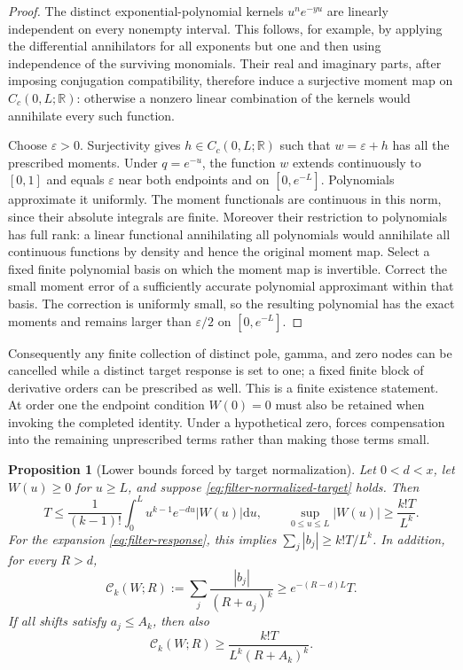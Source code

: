 \documentclass[11pt]{article}
\newtheorem{proposition}[theorem]{Proposition}
\theoremstyle{definition}
\theoremstyle{remark}
\newcommand{\R}{\mathbb R}
\newcommand{\dd}{\mathrm d}
\begin{document}
\begin{proof}
The distinct exponential-polynomial kernels $u^ne^{-yu}$ are linearly
independent on every nonempty interval.  This follows, for example, by
applying the differential annihilators for all exponents but one and
then using independence of the surviving monomials.  Their real and
imaginary parts, after imposing conjugation compatibility, therefore
induce a surjective moment map on $C_c(0,L;\R)$: otherwise a nonzero
linear combination of the kernels would annihilate every such function.

Choose $\varepsilon>0$.  Surjectivity gives $h\in C_c(0,L;\R)$ such
that $w=\varepsilon+h$ has all the prescribed moments.  Under
$q=e^{-u}$, the function $w$ extends continuously to $[0,1]$ and equals
$\varepsilon$ near both endpoints and on $[0,e^{-L}]$.
Polynomials approximate it uniformly.  The moment functionals are
continuous in this norm, since their absolute integrals are finite.
Moreover their restriction to polynomials has full rank: a linear
functional annihilating all polynomials would annihilate all continuous
functions by density and hence the original moment map.  Select a fixed
finite polynomial basis on which the moment map is invertible.
Correct the small moment error of a sufficiently accurate polynomial
approximant within that basis.  The correction is uniformly small, so
the resulting polynomial has the exact moments and remains larger than
$\varepsilon/2$ on $[0,e^{-L}]$.
\end{proof}

Consequently any finite collection of distinct pole, gamma, and zero
nodes can be cancelled while a distinct target response is set to one;
a fixed finite block of derivative orders can be prescribed as well.
This is a finite existence statement.  At order one the endpoint
condition $W(0)=0$ must also be retained when invoking the completed
identity.  Under a hypothetical zero,
 forces compensation into the remaining
unprescribed terms rather than making those terms small.

\begin{proposition}[Lower bounds forced by target normalization]
\label{prop:filter-normalization-cost}
Let $0<d<x$, let $W(u)\ge0$ for $u\ge L$, and suppose
\eqref{eq:filter-normalized-target} holds.  Then
\begin{equation}
 T\le\frac1{(k-1)!}\int_0^L u^{k-1}e^{-du}|W(u)|\dd u,
 \qquad
 \sup_{0\le u\le L}|W(u)|\ge\frac{k!T}{L^k}.
 \label{eq:filter-wall-cost}
\end{equation}
For the expansion \eqref{eq:filter-response}, this implies
$\sum_j|b_j|\ge k!T/L^k$.  In addition, for every $R>d$,
\begin{equation}
 \mathcal C_k(W;R):=\sum_j\frac{|b_j|}{(R+a_j)^k}
 \ge e^{-(R-d)L}T.
 \label{eq:filter-cauchy-cost}
\end{equation}
If all shifts satisfy $a_j\le A_k$, then also
\begin{equation}
 \mathcal C_k(W;R)\ge\frac{k!T}{L^k(R+A_k)^k}.
 \label{eq:filter-bounded-shift-cost}
\end{equation}
\end{proposition}
\end{document}
